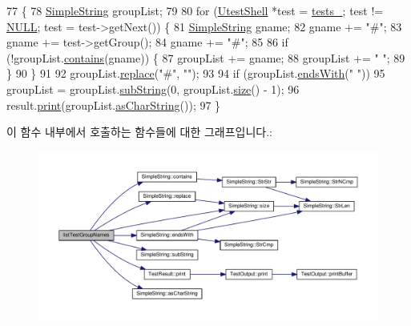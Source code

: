 \begin{DoxyCode}
77 \{
78     \hyperlink{class_simple_string}{SimpleString} groupList;
79 
80     \textcolor{keywordflow}{for} (\hyperlink{class_utest_shell}{UtestShell} *test = \hyperlink{class_test_registry_ac25160ebe0919f203197a4c65a72b02e}{tests\_}; test != \hyperlink{openavb__types__base__pub_8h_a070d2ce7b6bb7e5c05602aa8c308d0c4}{NULL}; test = test->getNext()) \{
81         \hyperlink{class_simple_string}{SimpleString} gname;
82         gname += \textcolor{stringliteral}{"#"};
83         gname += test->getGroup();
84         gname += \textcolor{stringliteral}{"#"};
85 
86         \textcolor{keywordflow}{if} (!groupList.\hyperlink{class_simple_string_abdbf6fb985e8643e24d7035e830b7b00}{contains}(gname)) \{
87             groupList += gname;
88             groupList += \textcolor{stringliteral}{" "};
89         \}
90     \}
91 
92     groupList.\hyperlink{class_simple_string_a432bd98f2897a79d54b8dd64de48247e}{replace}(\textcolor{stringliteral}{"#"}, \textcolor{stringliteral}{""});
93 
94     \textcolor{keywordflow}{if} (groupList.\hyperlink{class_simple_string_a96b82881ce1d49cee9ee0585bdf45ffb}{endsWith}(\textcolor{stringliteral}{" "}))
95         groupList = groupList.\hyperlink{class_simple_string_aa70337d05455667af5f0316572d76d40}{subString}(0, groupList.\hyperlink{class_simple_string_aac782da1f912bceb5d8ad00c8dc892ac}{size}() - 1);
96     result.\hyperlink{class_test_result_aeee8b15298e1baa2d0ced78c1fcb4b90}{print}(groupList.\hyperlink{class_simple_string_af7c0efaf31f42553f05719903c830be1}{asCharString}());
97 \}
\end{DoxyCode}


이 함수 내부에서 호출하는 함수들에 대한 그래프입니다.\+:
\nopagebreak
\begin{figure}[H]
\begin{center}
\leavevmode
\includegraphics[width=350pt]{class_test_registry_a614f92444318767c4f87367a16decb7b_cgraph}
\end{center}
\end{figure}





